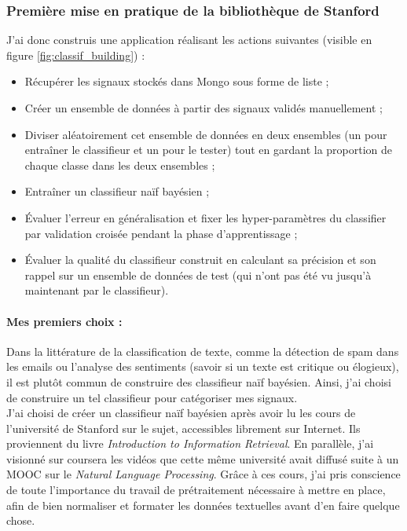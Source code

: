         \subsubsection{Première mise en pratique de la bibliothèque de Stanford}
                J'ai donc construis une application réalisant les actions suivantes (visible en figure \ref{fig:classif_building}) :
                \begin{itemize}
                    \item Récupérer les signaux stockés dans Mongo sous forme de liste ;
                    \item Créer un ensemble de données à partir des signaux validés manuellement ;
                    \item Diviser aléatoirement cet ensemble de données en deux ensembles (un pour entraîner le classifieur et un pour le tester) tout en gardant la proportion de chaque classe dans les deux ensembles ;
                    \item Entraîner un classifieur naïf bayésien ;
                    \item Évaluer l'erreur en généralisation et fixer les hyper-paramètres du classifier par validation croisée pendant la phase d'apprentissage ;
                    \item Évaluer la qualité du classifieur construit en calculant sa précision et son rappel sur un ensemble de données de test (qui n'ont pas \og été vu \fg jusqu'à maintenant par le classifieur).
                \end{itemize}

            \paragraph{Mes premiers choix :}
                Dans la littérature de la classification de texte, comme la détection de spam dans les emails ou l'analyse des sentiments (savoir si un texte est critique ou élogieux), il est plutôt commun de construire des classifieur naïf bayésien. Ainsi, j'ai choisi de construire un tel classifieur pour catégoriser mes signaux.\\

            J'ai choisi de créer un classifieur naïf bayésien après avoir lu les cours de l’université de Stanford sur le sujet, accessibles librement sur Internet. Ils proviennent du livre \textit{Introduction to Information Retrieval}\autocite{ir_web}.
            En parallèle, j'ai visionné sur coursera les vidéos que cette même université avait diffusé suite à un MOOC sur le \textit{Natural Language Processing}. Grâce à ces cours, j'ai pris conscience de toute l'importance du travail de prétraitement nécessaire à mettre en place, afin de bien normaliser et formater les données textuelles avant d'en faire quelque chose.\\

